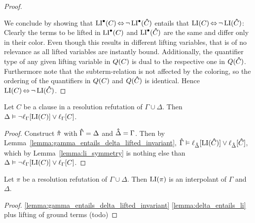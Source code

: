 \documentclass[,%
	draft=false,%
	numbers=noendperiod
	11pt,
	a4paper,
	oneside,%
	openany,
]{memoir}
\begin{document}
\begin{proof}
\begin{itemize}
\begin{itemize}
	\end{itemize}

	\end{itemize}


	We conclude by showing that 
	$\operatorname{LI}^\bullet(C) \operatorname{\Leftrightarrow} \lnot \operatorname{LI}^\bullet(\bm\hat C)$ 
	entails that 
	$\operatorname{LI}(C) \operatorname{\Leftrightarrow} \lnot \operatorname{LI}(\bm\hat C)$:
	Clearly the terms to be lifted in $\operatorname{LI}^\bullet(C)$ and $\operatorname{LI}^\bullet(\bm\hat C)$ are the same and differ only in their color.
	Even though this results in different lifting variables, that is of no relevance as all lifted variables are instantly bound.
	Additionally, the quantifier type of any given lifting variable in $Q(C)$ is dual to the respective one in $Q(\bm\hat C)$.
	Furthermore note that the subterm-relation is not affected by the coloring, so the ordering of the quantifiers in $Q(C)$ and $Q(\bm\hat C)$ is identical.
	Hence 
	$\operatorname{LI}(C) \operatorname{\Leftrightarrow} \lnot \operatorname{LI}(\bm\hat C)$.
\end{proof}


\begin{lemma}
	\label{lemma:delta_entails_li}
	Let $C$ be a clause in a resolution refutation of $\Gamma \cup \Delta$.
	Then
	$\Delta \vDash \lnot\ell_{\Gamma}[\operatorname{LI}(C)] \lor \ell_{\Gamma}[C]$.
\end{lemma}
\begin{proof}
	Construct $\bm\hat \pi$ with $\bm\hat \Gamma = \Delta$ and $\bm\hat \Delta = \Gamma$. 
	Then by Lemma~\ref{lemma:gamma_entails_delta_lifted_invariant}, $\bm\hat \Gamma \vDash \ell_{\bm\hat \Delta}[\operatorname{LI}(\bm\hat C)] \lor \ell_{\bm\hat \Delta}[\bm\hat C]$, 
	which by Lemma~\ref{lemma:li_symmetry} is nothing else than
	$\Delta \vDash \lnot \ell_{\Gamma}[\operatorname{LI}(C)] \lor \ell_{\Gamma}[C]$.
\end{proof}

\begin{thm}
	Let $\pi$ be a resolution refutation of $\Gamma \cup \Delta$.
	Then $\operatorname{LI}(\pi)$ is an interpolant of $\Gamma$ and $\Delta$.
\end{thm}
\begin{proof}
	\ref{lemma:gamma_entails_delta_lifted_invariant}
	\ref{lemma:delta_entails_li}
	plus lifting of ground terms (todo)

\end{proof}
\end{document}

